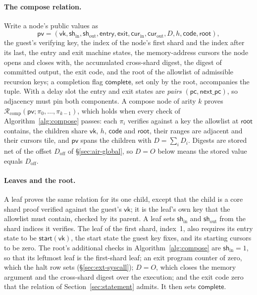 \paragraph{The compose relation.} Write a node's public values as
\[
  \mathsf{pv} = (\mathsf{vk}, \mathsf{sh}_{\mathrm{in}}, \mathsf{sh}_{\mathrm{out}}, \mathsf{entry}, \mathsf{exit}, \mathsf{cur}_{\mathrm{in}}, \mathsf{cur}_{\mathrm{out}}, D, h, \mathsf{code}, \mathsf{root}),
\]
the guest's verifying key, the index of the node's first shard and the index after its last, the entry and exit machine states, the memory-address cursors the node opens and closes with, the accumulated cross-shard digest, the digest of committed output, the exit code, and the root of the allowlist of admissible recursion keys; a completion flag $\mathsf{complete}$, set only by the root, accompanies the tuple. With a delay slot the entry and exit states are \emph{pairs} $(\mathsf{pc}, \mathsf{next\_pc})$, so adjacency must pin both components. A compose node of arity $k$ proves $\mathcal R_{\mathrm{comp}}(\mathsf{pv}; \pi_0,\dots,\pi_{k-1})$, which holds when every check of Algorithm~\ref{alg:compose} passes: each $\pi_i$ verifies against a key the allowlist at $\mathsf{root}$ contains, the children share $\mathsf{vk}$, $h$, $\mathsf{code}$ and $\mathsf{root}$, their ranges are adjacent and their cursors tile, and $\mathsf{pv}$ spans the children with $D = \sum_i D_i$. Digests are stored net of the offset $D_{\mathrm{off}}$ of \S\ref{sec:air-global}, so $D = O$ below means the stored value equals $D_{\mathrm{off}}$.

\paragraph{Leaves and the root.} A leaf proves the same relation for its one child, except that the child is a core shard proof verified against the guest's $\mathsf{vk}$; it is the leaf's own key that the allowlist must contain, checked by its parent. A leaf sets $\mathsf{sh}_{\mathrm{in}}$ and $\mathsf{sh}_{\mathrm{out}}$ from the shard indices it verifies. The leaf of the first shard, index~1, also requires its entry state to be $\mathsf{start}(\mathsf{vk})$, the start state the guest key fixes, and its starting cursors to be zero. The root's additional checks in Algorithm~\ref{alg:compose} are $\mathsf{sh}_{\mathrm{in}} = 1$, so that its leftmost leaf is the first-shard leaf; an exit program counter of zero, which the halt row sets (\S\ref{sec:ext-syscall}); $D = O$, which closes the memory argument and the cross-shard digest over the execution; and the exit code zero that the relation of Section~\ref{sec:statement} admits. It then sets $\mathsf{complete}$.


